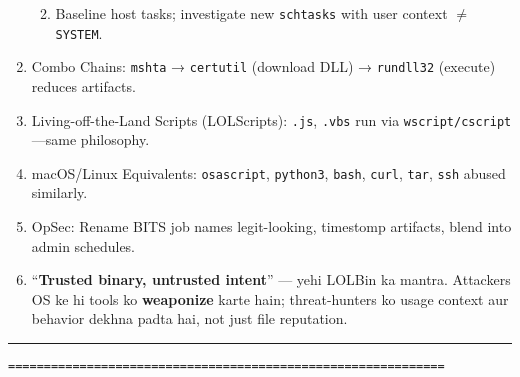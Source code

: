 \documentclass[a4paper,12pt]{article}
\begin{document}
\begin{enumerate}[leftmargin=*,itemsep=0.5em]
\begin{enumerate}
\begin{tcolorbox}[colback=codebg, boxrule=0.5pt, arc=4pt, boxsep=5pt]
        \end{tcolorbox}
      \item Baseline host tasks; investigate new \texttt{schtasks} with user context $\neq$ \texttt{SYSTEM}.
    \end{enumerate}
  \item Combo Chains: \texttt{mshta} → \texttt{certutil} (download DLL) → \texttt{rundll32} (execute) reduces artifacts.
  \item Living-off-the-Land Scripts (LOLScripts): \texttt{.js}, \texttt{.vbs} run via \texttt{wscript/cscript}—same philosophy.
  \item macOS/Linux Equivalents: \texttt{osascript}, \texttt{python3}, \texttt{bash}, \texttt{curl}, \texttt{tar}, \texttt{ssh} abused similarly.
  \item OpSec: Rename BITS job names legit-looking, timestomp artifacts, blend into admin schedules.
  \item “\textbf{Trusted binary, untrusted intent}” — yehi LOLBin ka mantra. Attackers OS ke hi tools ko \textbf{weaponize} karte hain; threat-hunters ko usage context aur behavior dekhna padta hai, not just file reputation.

\end{enumerate}

\vspace{1em}
\noindent\rule{\textwidth}{1pt}
\texttt{=============================================================}

\end{document}
